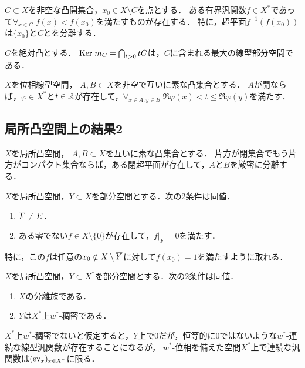 \documentclass[uplatex,dvipdfmx]{jsreport}
\begin{document}
\begin{lemma}[凸開集合と点の分離]
    $C\subset X$を非空な凸開集合，$x_0\in X\setminus C$を点とする．
    ある有界汎関数$f\in X^*$であって$\forall_{x\in C}\;f(x)<f(x_0)$を満たすものが存在する．
    特に，超平面$f^{-1}(f(x_0))$は$\{x_0\}$と$C$とを分離する．
\end{lemma}

\begin{lemma}[計測写像の核の特徴付け]
    $C$を絶対凸とする．
    $\mathrm{Ker}\; m_C=\bigcap_{t>0}tC$は，$C$に含まれる最大の線型部分空間である．
\end{lemma}

\begin{theorem}\label{thm-Hahn-Banach-separation-theorem}
    $X$を位相線型空間，
    $A,B\subset X$を非空で互いに素な凸集合とする．
    $A$が開ならば，$\varphi\in X^*$と$t\in\mathbb{R}$が存在して，$\forall_{x\in A,y\in B}\;\Re\varphi(x)<t\le\Re\varphi(y)$を満たす．
\end{theorem}

\subsection{局所凸空間上の結果2}

\begin{theorem}
    $X$を局所凸空間，
    $A,B\subset X$を互いに素な凸集合とする．
    片方が閉集合でもう片方がコンパクト集合ならば，ある閉超平面が存在して，$A$と$B$を厳密に分離する．
\end{theorem}

\begin{corollary}
    $X$を局所凸空間，$Y\subset X$を部分空間とする．次の2条件は同値．
    \begin{enumerate}
        \item $\overline{F}\ne E$．
        \item ある零でない$f\in X\setminus\{0\}$が存在して，$f|_F=0$を満たす．
    \end{enumerate}
    特に，この$f$は任意の$x_0\notin X\setminus\overline{Y}$に対して$f(x_0)=1$を満たすように取れる．
\end{corollary}

\begin{corollary}[双対空間の稠密部分空間の特徴付け]\label{cor-separating-subspace-is-dense}
    $X$を局所凸空間，$Y\subset X^*$を部分空間とする．次の2条件は同値．
    \begin{enumerate}
        \item $X$の分離族である．
        \item $Y$は$X^*$上$w^*$-稠密である．
    \end{enumerate}
\end{corollary}
\begin{Proof}
    $X^*$上$w^*$-稠密でないと仮定すると，$Y$上で$0$だが，恒等的に$0$ではないような$w^*$-連続な線型汎関数が存在することになるが，
    $w^*$-位相を備えた空間$X^*$上で連続な汎関数は$(\mathrm{ev}_x)_{x\in X^*}$に限る．
\end{Proof}
\end{document}
